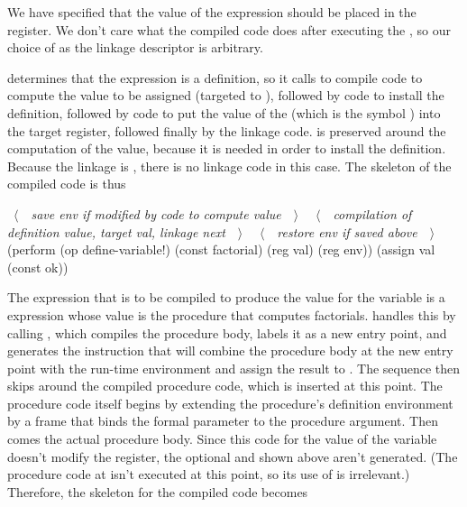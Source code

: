 \noindent
We have specified that the value of the  expression should be
placed in the  register.  We don't care what the compiled code does
after executing the , so our choice of  as the linkage
descriptor is arbitrary.

 determines that the expression is a definition, so it calls
 to compile code to compute the value to be assigned
(targeted to ), followed by code to install the definition, followed
by code to put the value of the  (which is the symbol )
into the target register, followed finally by the linkage code.   is
preserved around the computation of the value, because it is needed in order to
install the definition.  Because the linkage is , there is no
linkage code in this case.  The skeleton of the compiled code is thus

\begin{codeBlock}
~\(\langle \)~~\emph{save \emph{env} if modified by code to compute value}~~\(\rangle \)~
  ~\(\langle \)~~\emph{compilation of definition value, target \emph{val}, linkage \emph{next}}~~\(\rangle \)~
  ~\(\langle \)~~\emph{restore \emph{env} if saved above}~~\(\rangle \)~
  (perform (op define-variable!)
           (const factorial)
           (reg val)
           (reg env))
  (assign val (const ok))
\end{codeBlock}

\noindent
The expression that is to be compiled to produce the value for the variable
 is a  expression whose value is the procedure
that computes factorials.   handles this by calling
, which compiles the procedure body, labels it as a new
entry point, and generates the instruction that will combine the procedure body
at the new entry point with the run-time environment and assign the result to
.  The sequence then skips around the compiled procedure code, which
is inserted at this point.  The procedure code itself begins by extending the
procedure's definition environment by a frame that binds the formal parameter
 to the procedure argument.  Then comes the actual procedure body.
Since this code for the value of the variable doesn't modify the 
register, the optional  and  shown above aren't
generated.  (The procedure code at  isn't executed at this point,
so its use of  is irrelevant.)  Therefore, the skeleton for the
compiled code becomes

